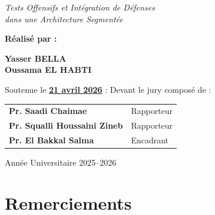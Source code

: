 \documentclass[12pt,a4paper,openany]{report}
\newif\ifshowpagenumbers
\newcommand{\hidepagenumbers}{\showpagenumbersfalse\pagestyle{empty}}
\begin{document}
\begin{titlepage}
		\vspace{0.3cm}
		
		{\normalsize\itshape\color{primary}
			Tests Offensifs et Intégration de Défenses\\
			dans une Architecture Segmentée
		}
		
		\vspace{0.3cm}
		\begin{center}
		\end{center}
		\vspace{0.8cm}
		
		{\normalsize\bfseries
			Réalisé par :
		}
		
		\vspace{0.4cm}
		
		{\normalsize\bfseries\color{primary}
			Yasser BELLA\\
			Oussama EL HABTI
		}
		
		\vfill
		\vspace{0.5cm}
		
		{\normalsize
			Soutenue le \textbf{\color{primary}\underline{21 avril 2026}} : Devant le jury composé de :\\
		}
		
		\vspace{0.6cm}
		
		{\normalsize
			\begin{tabular}{ll}
				\textbf{\color{primary}Pr. Saadi Chaimae} & Rapporteur \\[0.3cm]
				\textbf{\color{primary}Pr. Squalli Houssaini Zineb} & Rapporteur \\[0.3cm]
				\textbf{\color{primary}Pr. El Bakkal Salma} & Encadrant \\
			\end{tabular}
		}
		
		\vfill
		
		
		
		\vspace{1cm}
		
		{\small\color{black}
			Année Universitaire 2025--2026
		}
		
	\end{titlepage}
	
	\hidepagenumbers
	\chapter*{\centering \texorpdfstring{Remerciements}{}}
	\vspace*{1.2cm}
	\begingroup
	\large
	
\end{document}
